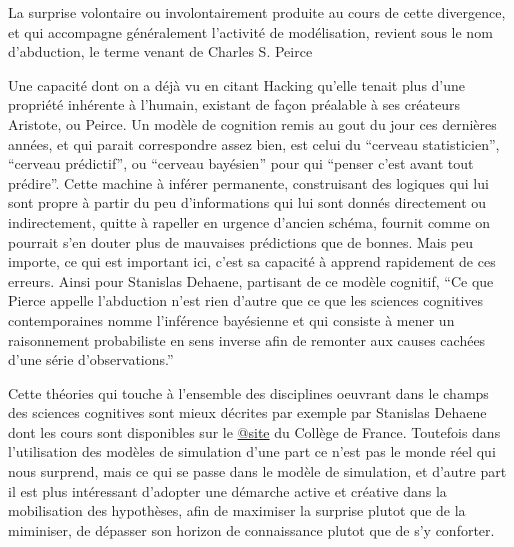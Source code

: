 La surprise volontaire ou involontairement produite au cours de cette divergence, et qui accompagne généralement l'activité de modélisation, revient sous le nom d'abduction, le terme venant de Charles S. Peirce \autocites{Besse2000, Banos2013, Phan2006, Livet2014} 

Une capacité dont on a déjà vu en citant Hacking \autocites{Hacking1983,Hacking2003, Hacking2006} qu'elle tenait plus d'une propriété inhérente à l'humain, existant de façon préalable à ses créateurs Aristote, ou Peirce. Un modèle de cognition remis au gout du jour ces dernières années, et qui parait correspondre assez bien, est celui du \enquote{cerveau statisticien},  \enquote{cerveau prédictif}, ou \enquote{cerveau bayésien} pour qui \enquote{penser c'est avant tout prédire}. Cette machine à inférer permanente, construisant des logiques qui lui sont propre à partir du peu d'informations qui lui sont donnés directement ou indirectement, quitte à rapeller en urgence d'ancien schéma, fournit comme on pourrait s'en douter plus de mauvaises prédictions que de bonnes. Mais peu importe, ce qui est important ici, c'est sa capacité à apprend rapidement de ces erreurs. 
Ainsi pour Stanislas Dehaene, partisant de ce modèle cognitif, \enquote{Ce que Pierce appelle l'abduction n'est rien d'autre que ce que les sciences cognitives contemporaines nomme l'inférence bayésienne et qui consiste à mener un raisonnement probabiliste en sens inverse afin de remonter aux causes cachées d'une série d'observations.}

Cette théories qui touche à l'ensemble des disciplines oeuvrant dans le champs des sciences cognitives sont mieux décrites par exemple par Stanislas Dehaene dont les cours sont disponibles sur le \href{http://www.college-de-france.fr/site/stanislas-dehaene}{@site} du Collège de France. Toutefois dans l'utilisation des modèles de simulation d'une part ce n'est pas le monde réel qui nous surprend, mais ce qui se passe dans le modèle de simulation, et d'autre part il est plus intéressant d'adopter une démarche active et créative dans la mobilisation des hypothèses, afin de maximiser la surprise plutot que de la miminiser, de dépasser son horizon de connaissance plutot que de s'y conforter. 

